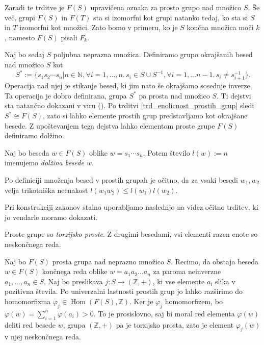 Zaradi te trditve je $F(S)$ upravičena oznaka za prosto grupo nad množico $S$. Še več, grupi $F(S)$ in $F(T)$ sta si izomorfni kot grupi natanko tedaj, ko sta si $S$ in $T$ izomorfni kot množici.
Zato bomo v primeru, ko je $S$ končna množica moči $k$, namesto $F(S)$ pisali $F_k$.

Naj bo sedaj $S$ poljubna neprazna množica. Definiramo grupo okrajšanih besed nad množico $S$ kot \begin{equation*}
    S^* := \{ s_1 s_2 \cdots s_n  \vert n \in \mathbb{N}, \forall i = 1, \ldots, n.\,  s_i \in S \cup S^{-1} , \forall i = 1 , \ldots n-1 .\, s_i \neq s_{i + 1}^{-1} \}.
\end{equation*}
Operacija nad njej je stikanje besed, ki jim nato še okrajšamo sosednje inverze. Ta operacija je dobro definirana, grupa $S^*$ pa prosta nad množico $S$. 
Ti dejstvi sta natančno dokazani v viru (\cite[str.~4, tridtev 1.9]{Lyndon_Schupp_2015}). Po trditvi \ref{trd_enolicnost_prostih_grup} sledi $S^* \cong F(S)$,
zato si lahko elemente prostih grup predstavljamo kot okrajšane besede. Z upoštevanjem tega dejstva lahko elementom proste grupe $F(S)$ definiramo dolžino.

\begin{definicija}
\label{def_dolzina_besede}
Naj bo beseda $w \in  F(S)$ oblike $w = s_1 \cdots s_n$. Potem število $l(w) := n$ imenujemo \emph{dolžina besede $w$}.
\end{definicija}
\begin{opomba}\label{opm_trikotniska_neenakost}
    Po definiciji množenja besed v prostih grupah je očitno, da za vsaki besedi $w_1 , w_2$ velja trikotniška neenakost $l(w_1 w_2) \le l(w_1) l(w_2)$.
\end{opomba}

Pri konstrukciji zakonov stalno uporabljamo naslednjo na videz očitno trditev, ki jo vendarle moramo dokazati. 

\begin{trditev}\label{trd_prosta_grupa_je_torzijsko_prosta}
    Proste grupe so \emph{torzijsko proste}. Z drugimi besedami, vsi elementi razen enote so neskončnega reda. 
\end{trditev}
\begin{dokaz}
    Naj bo $F(S)$ prosta grupa nad neprazno množico $S$. Recimo, da obstaja beseda $w \in F(S)$ končnega reda oblike $w = a_1 a_2 \ldots a_n$ za paroma neinverzne $a_1, \ldots , a_n \in S$. Naj bo preslikava $j : S \to (\mathbb{Z}, +)$, ki vse elemente $a_i$ slika v pozitivna števila. Po univerzalni lastnosti prostih grup jo lahko razširimo do homomorfizma $\varphi_j \in \operatorname{Hom}(F(S), \mathbb{Z})$. 
    Ker je $\varphi_j$ homomorfizem, bo $\varphi(w) = \sum_{i = 1}^{n} \varphi(a_i) > 0$. To je prosislovno, saj bi moral red elementa $\varphi(w)$ deliti red besede $w$,
    grupa $(\mathbb{Z}, +)$ pa je torzijsko prosta, zato je element $\varphi_j(w)$ v njej neskončnega reda.
\end{dokaz}


